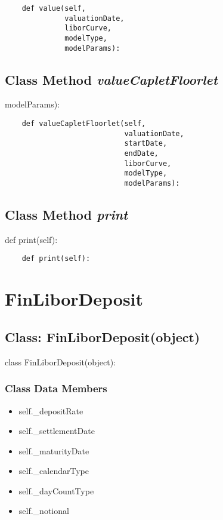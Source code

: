 \documentclass[twoside,11pt]{book}
\begin{document}
\begin{lstlisting}
    def value(self, 
              valuationDate,
              liborCurve, 
              modelType, 
              modelParams):
\end{lstlisting}

\subsection{Class Method {\it valueCapletFloorlet}}
modelParams):

\begin{lstlisting}
    def valueCapletFloorlet(self,
                            valuationDate,
                            startDate, 
                            endDate, 
                            liborCurve, 
                            modelType, 
                            modelParams):
\end{lstlisting}

\subsection{Class Method {\it print}}
def print(self):

\begin{lstlisting}
    def print(self):
\end{lstlisting}

\newpage
\section{FinLiborDeposit}

\subsection{Class: FinLiborDeposit(object)}
class FinLiborDeposit(object):

\subsubsection{Class Data Members}
\begin{itemize}
\item{self.\_depositRate}
\item{self.\_settlementDate}
\item{self.\_maturityDate}
\item{self.\_calendarType}
\item{self.\_dayCountType}
\item{self.\_notional}
\end{itemize}
\end{document}
